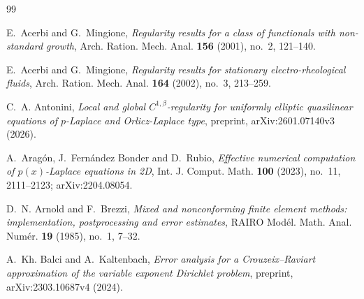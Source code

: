 \documentclass[11pt]{amsart}
\theoremstyle{definition}
\theoremstyle{remark}
\numberwithin{equation}{section}
\begin{document}
\begin{thebibliography}{99}
\setlength{\itemsep}{0pt}

E.~Acerbi and G.~Mingione, \emph{Regularity results for a class of functionals with non-standard growth}, Arch. Ration. Mech. Anal. \textbf{156} (2001), no.~2, 121--140.

E.~Acerbi and G.~Mingione, \emph{Regularity results for stationary electro-rheological fluids}, Arch. Ration. Mech. Anal. \textbf{164} (2002), no.~3, 213--259.

C.~A. Antonini, \emph{Local and global $C^{1,\beta}$-regularity for uniformly elliptic quasilinear equations of $p$-Laplace and Orlicz-Laplace type}, preprint, arXiv:2601.07140v3 (2026).

A.~Arag\'on, J.~Fern\'andez Bonder and D.~Rubio, \emph{Effective numerical computation of $p(x)$-Laplace equations in 2D}, Int. J. Comput. Math. \textbf{100} (2023), no.~11, 2111--2123; arXiv:2204.08054.

D.~N. Arnold and F.~Brezzi, \emph{Mixed and nonconforming finite element methods: implementation, postprocessing and error estimates}, RAIRO Mod\'el. Math. Anal. Num\'er. \textbf{19} (1985), no.~1, 7--32.

A.~Kh. Balci and A.~Kaltenbach, \emph{Error analysis for a Crouzeix--Raviart approximation of the variable exponent Dirichlet problem}, preprint, arXiv:2303.10687v4 (2024).


\end{thebibliography}
\end{document}
